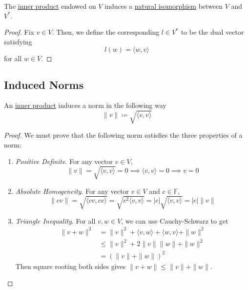 	\begin{theorem}
	  \label{thm:basis-free-isomorphism-induced-by-inner-product}
    The \hyperref[def:inner-product]{inner product} endowed on $V$ induces a \hyperref[cat-def:natural-isomorphism]{natural isomorphism} between $V$ and $V^\ast$. 
  \end{theorem}
  \begin{proof}
    Fix $v \in V$. Then, we define the corresponding $l \in V^\ast$ to be the dual vector satisfying 
    \begin{equation}
      l(w) = \langle w, v \rangle
    \end{equation}
		for all $w \in V$. 
  \end{proof}

\subsection{Induced Norms}

  \begin{lemma}
    \label{thm:inner-product-induces-norm}
    An \hyperref[def:inner-product]{inner product} induces a norm in the following way
    \begin{equation}
      \|v\| \coloneqq \sqrt{\langle v, v \rangle} 
    \end{equation}
  \end{lemma}
	\begin{proof}
		We must prove that the following norm satisfies the three properties of a norm: 
		\begin{enumerate}
			\item \textit{Positive Definite}. For any vector $v \in V$, 
				\begin{equation}
					\|v\| = \sqrt{\langle v, v \rangle} = 0 \implies \langle v, v \rangle = 0 \implies v = 0
				\end{equation}
			\item \textit{Absolute Homogeneity}. For any vector $v \in V$ and $c \in \mathbb{F}$, 
				\begin{equation}
					\|c v\| = \sqrt{\langle c v, cv \rangle} = \sqrt{c^2 \langle v, v \rangle} = |c| \sqrt{\langle v, v \rangle} = |c| \|v\|
				\end{equation}
		  \item \textit{Triangle Inequality}. For all $v, w \in V$, we can use Cauchy-Schwarz to get
				\begin{align}
					\|v + w\|^2 & = \|v\|^2 + \langle v, w \rangle + \langle w, v \rangle + \|w\|^2 \\  
											& \leq \|v\|^2 + 2 \|v\|\|w\|  + \|w\|^2 \\  
											& = (\|v\| + \|w\|)^2 
				\end{align}
				Then square rooting both sides gives $\|v + w\| \leq \|v\| + \|w\|$. 
		\end{enumerate}
	\end{proof}

